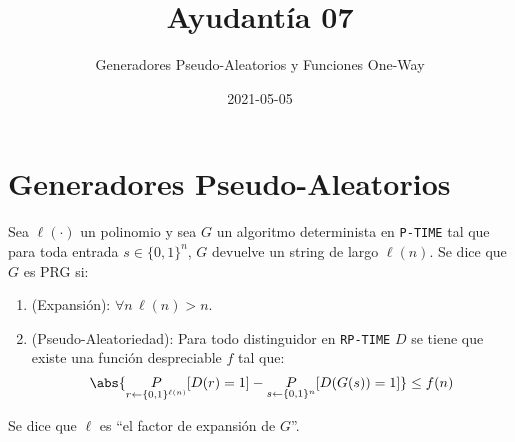 \documentclass{ayudantia}
\title{Ayudantía 07}
\subtitle{Generadores Pseudo-Aleatorios y Funciones One-Way}
\date{2021-05-05}
\begin{document}
\maketitle
\section{Generadores Pseudo-Aleatorios}
\begin{defn}
    Sea \(\ell(\cdot)\) un polinomio y sea \(G\) un algoritmo determinista en \texttt{P-TIME} tal que para toda entrada \(s\in\{0,1\}^n\), \(G\) devuelve un string de largo \(\ell(n)\). Se dice que \(G\) es PRG si:
    \begin{enumerate}
        \item (Expansión): \(\forall n\,\ell(n)>n\).
        \item (Pseudo-Aleatoriedad): Para todo distinguidor en \texttt{RP-TIME} \(D\) se tiene que existe una función despreciable \(f\) tal que:
        \begin{equation*}
            \abs{\underset{r\leftarrow\{0,1\}^{\ell(n)}}{P}[D(r)=1]-\underset{s\leftarrow\{0,1\}^n}{P}[D(G(s))=1]}\leq f(n)
        \end{equation*}
    \end{enumerate}
\end{defn}
\begin{remark}
    Se dice que \(\ell\) es ``el factor de expansión de \(G\)''.
\end{remark}
\end{document}
